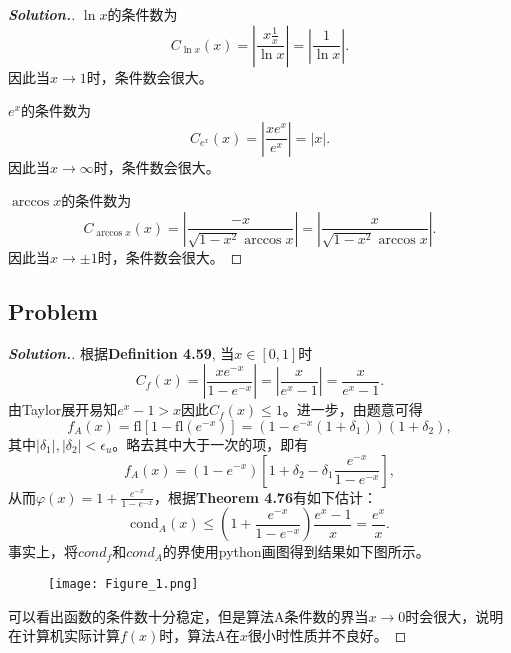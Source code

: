 \documentclass{ctexart}
\begin{document}
\begin{sloppypar}
\begin{proof}[\textbf{Solution.}]
$\ln{x}$的条件数为
\begin{equation}
    C_{\ln{x}}(x) = \left|\frac{x\frac{1}{x}}{\ln{x}}\right|=\left|\frac{1}{\ln{x}}\right|.
\end{equation}
因此当$x \rightarrow 1$时，条件数会很大。

$e^x$的条件数为
\begin{equation}
    C_{e^x}(x) = \left|\frac{xe^x}{e^x}\right|=\left|x\right|.
\end{equation}
因此当$x \rightarrow \infty$时，条件数会很大。

$\arccos{x}$的条件数为
\begin{equation}
    C_{\arccos{x}}(x) = \left|\frac{-x}{\sqrt{1-x^2}\arccos{x}}\right|=\left|\frac{x}{\sqrt{1-x^2}\arccos{x}}\right|.
\end{equation}
因此当$x \rightarrow \pm1$时，条件数会很大。
\end{proof}

\subsection*{Problem \uppercase\expandafter{}}
\begin{proof}[\textbf{Solution.}]
根据\textbf{Definition 4.59}, 当$x\in[0,1]$时
\begin{equation}
    C_{f}(x) = \left|\frac{xe^{-x}}{1-e^{-x}}\right|=\left|\frac{x}{e^x-1}\right| = \frac{x}{e^x-1}.
\end{equation}
由Taylor展开易知$e^x-1>x$因此$C_{f}(x)\leq 1$。进一步，由题意可得
\begin{equation}
   f_A(x) = \mathrm{fl}\left[1-\mathrm{fl}(e^{-x}) \right] = (1-e^{-x}(1+\delta_1))(1+\delta_2),
\end{equation}
其中$|\delta_1|,|\delta_2|<\epsilon_u$。略去其中大于一次的项，即有
\begin{equation}
   f_A(x) = (1-e^{-x})[1+\delta_2-\delta_1\frac{e^{-x}}{1-e^{-x}}],
\end{equation}
从而$\varphi(x) = 1+ \frac{e^{-x}}{1-e^{-x}}$，根据\textbf{Theorem 4.76}有如下估计：
\begin{equation}
    \mathrm{cond}_A(x) \leq (1+ \frac{e^{-x}}{1-e^{-x}})\frac{e^x-1}{x} = \frac{e^x}{x}.
\end{equation}
事实上，将$cond_f$和$cond_A$的界使用python画图得到结果如下图所示。
\begin{figure}[H]
\centering
\texttt{[image: Figure\_1.png]}
\label{Fig1}
\end{figure}
可以看出函数的条件数十分稳定，但是算法A条件数的界当$x \rightarrow 0$时会很大，说明在计算机实际计算$f(x)$时，算法A在$x$很小时性质并不良好。
\end{proof}

\end{sloppypar}
\end{document}
